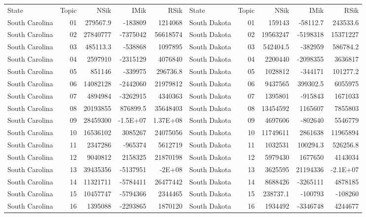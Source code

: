 \begin{table}[]
	\footnotesize
	\begin{tabular}{lrrrrlrrrr}
	State & Topic & NSik & IMik & RSik & State & Topic & NSik & IMik & RSik \\
		South Carolina &  01  & 279567.9 & -183809 & 1214068 & South Dakota &  01  & 159143 & -58112.7 & 243533.6 \\
		South Carolina &  02  & 27840777 & -7375042 & 56618574 & South Dakota &  02  & 19563247 & -5198318 & 15371227 \\
		South Carolina &  03  & 485113.3 & -538868 & 1097895 & South Dakota &  03  & 542404.5 & -382959 & 586784.2 \\
		South Carolina &  04  & 2597910 & -2315129 & 4076840 & South Dakota &  04  & 2200440 & -2098355 & 3636817 \\
		South Carolina &  05  & 851146 & -339975 & 296736.8 & South Dakota &  05  & 1028812 & -344171 & 101277.2 \\
		South Carolina &  06  & 14082128 & -2442060 & 21979812 & South Dakota &  06  & 9437565 & 399302.5 & 6055975 \\
		South Carolina &  07  & 4894984 & -3262915 & 4340363 & South Dakota &  07  & 1395801 & -915843 & 1671033 \\
		South Carolina &  08  & 20193855 & 876899.5 & 35648403 & South Dakota &  08  & 13454592 & 1165607 & 7855803 \\
		South Carolina &  09  & 28459300 & -1.5E+07 & 1.37E+08 & South Dakota &  09  & 4697606 & -802640 & 5546779 \\
		South Carolina &  10 & 16536102 & 3085267 & 24075056 & South Dakota &  10 & 11749611 & 2861638 & 11965894 \\
		South Carolina &  11 & 2347286 & -965374 & 5612719 & South Dakota &  11 & 1032531 & 100294.3 & 526256.8 \\
		South Carolina &  12 & 9040812 & 2158325 & 21870198 & South Dakota &  12 & 5979430 & 1677650 & 4143034 \\
		South Carolina &  13 & 39435356 & -5137951 & -2E+08 & South Dakota &  13 & 3625595 & 21194336 & -2.1E+07 \\
		South Carolina &  14 & 11321711 & -5784411 & 26477442 & South Dakota &  14 & 8688426 & -3265111 & 4878185 \\
		South Carolina &  15 & 10457747 & -5794366 & 2344465 & South Dakota &  15 & 238737.1 & -100793 & -108260 \\
		South Carolina &  16 & 1395088 & -2293865 & 1870120 & South Dakota &  16 & 1934492 & -3346748 & 4244677 \\

\end{tabular}
\end{table}
